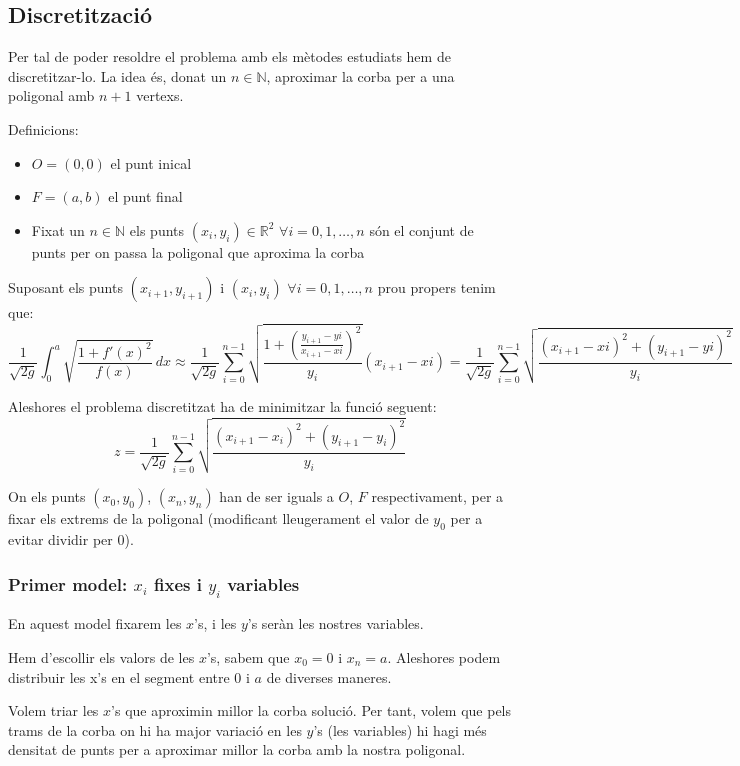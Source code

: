 \documentclass[10pt]{extarticle}
\begin{document}
\subsection{Discretització}
Per tal de poder resoldre el problema amb els mètodes estudiats hem de discretitzar-lo. La idea és, donat un $n \in \mathbb{N}$, aproximar la corba per a una poligonal amb $n+1$ vertexs. \vspace{.25cm}

Definicions:
\begin{itemize}
    \item $O = (0,0)$ el punt inical
    \item $F = (a,b)$ el punt final
    \item Fixat un $n \in \mathbb{N}$ els punts $(x_i,y_i) \in \mathbb{R}^2$ $\forall i = 0,1,\hdots,n$ són el conjunt de punts per on passa la poligonal que aproxima la corba
\end{itemize}

Suposant els punts $(x_{i+1}, y_{i+1})$ i $(x_i,y_i)$ $\forall i=0,1,\hdots,n$ prou propers tenim que:
$$
\frac{1}{\sqrt{2g}} \int_{0}^{a} \sqrt{\frac{1+f'(x)^2}{f(x)}} \,dx \approx \frac{1}{\sqrt{2g}} \sum_{i = 0}^{n-1} \sqrt{\frac{1+\left(\frac{y_{i+1}-y{i}}{x_{i+1}-x{i}}\right)^2}{y_i}} (x_{i+1}-x{i}) = \frac{1}{\sqrt{2g}} \sum_{i = 0}^{n-1} \sqrt{\frac{(x_{i+1}-x{i})^2+(y_{i+1}-y{i})^2}{y_i}}
$$

Aleshores el problema discretitzat ha de minimitzar la funció seguent:
$$
z = \frac{1}{\sqrt{2g}} \sum_{i = 0}^{n-1} \sqrt{\frac{(x_{i+1}-x_i)^2+(y_{i+1}-y_i)^2}{y_i}}
$$

On els punts $(x_0,y_0)$, $(x_n,y_n)$ han de ser iguals a $O$, $F$ respectivament, per a fixar els extrems de la poligonal (modificant lleugerament el valor de $y_0$ per a evitar dividir per $0$).

\subsubsection{Primer model: $x_i$ fixes i $y_i$ variables}

En aquest model fixarem les $x$'s, i les $y$'s seràn les nostres variables. \vspace{.25cm}

Hem d'escollir els valors de les $x$'s, sabem que $x_0 = 0$ i $x_n = a$. Aleshores podem distribuir les x's en el segment entre $0$ i $a$ de diverses maneres. \vspace{.25cm}

Volem triar les $x$'s que aproximin millor la corba solució. Per tant, volem que pels trams de la corba on hi ha major variació en les $y$'s (les variables) hi hagi més densitat de punts per a aproximar millor la corba amb la nostra poligonal. \vspace{.25cm}
\end{document}

